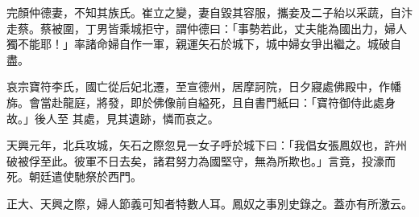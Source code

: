 \begin{pinyinscope}
 完顏仲德妻，不知其族氏。崔立之變，妻自毀其容服，攜妾及二子紿以采蔬，自汴走蔡。蔡被圍，丁男皆乘城拒守，謂仲德曰：「事勢若此，丈夫能為國出力，婦人獨不能耶！」率諸命婦自作一軍，親運矢石於城下，城中婦女爭出繼之。城破自盡。



 哀宗寶符李氏，國亡從后妃北遷，至宣德州，居摩訶院，日夕寢處佛殿中，作幡旆。會當赴龍庭，將發，即於佛像前自縊死，且自書門紙曰：「寶符御侍此處身故。」後人至
 其處，見其遺跡，憐而哀之。



 天興元年，北兵攻城，矢石之際忽見一女子呼於城下曰：「我倡女張鳳奴也，許州破被俘至此。彼軍不日去矣，諸君努力為國堅守，無為所欺也。」言竟，投濠而死。朝廷遣使馳祭於西門。



 正大、天興之際，婦人節義可知者特數人耳。鳳奴之事別史錄之。蓋亦有所激云。



\end{pinyinscope}